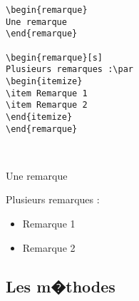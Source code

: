 \documentclass[ams,openany,10pt,presentation,latin1]{mathbook}
\begin{document}
\begin{minipage}{0.35\linewidth}
\begin{lstlisting}
\begin{remarque}
Une remarque
\end{remarque}

\begin{remarque}[s]
Plusieurs remarques :\par
\begin{itemize}
\item Remarque 1
\item Remarque 2
\end{itemize}
\end{remarque}
\end{lstlisting}
\end{minipage}
\begin{minipage}{0.1\linewidth}
~\par
\end{minipage}
\begin{minipage}{0.45\linewidth}
\begin{remarque}
Une remarque
\end{remarque}

\begin{remarque}[s]
Plusieurs remarques :\par
\begin{itemize}
\item Remarque 1
\item Remarque 2
\end{itemize}
\end{remarque}
\end{minipage}

\subsection{Les m�thodes}
\end{document}
